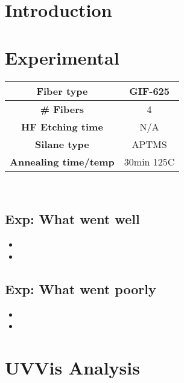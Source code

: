 \section{Introduction}

\section{Experimental}


\begin{center}
\begin{tabular}{| c | c |}
 \hline
 {\bf Fiber type} & GIF-625 \\ \hline
 {\bf # Fibers} & 4  \\ \hline
 {\bf HF Etching time} & N/A \\ \hline
 {\bf Silane type} & APTMS \\ \hline
 {\bf Annealing time/temp} & 30min 125C  \\ \hline
\end{tabular}
\end{center}

\\


\subsection{Exp: What went well}

\begin{itemize}
\item{}
\item{}
\end{itemize}

\subsection{Exp: What went poorly}

\begin{itemize}
\item{}
\item{}
\end{itemize}

\section{UVVis Analysis}




